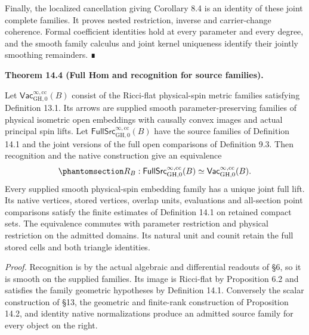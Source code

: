 \documentclass[
  english,
  11pt,
  reqno]{amsart}
\makeatletter
\newcommand{\pandocstatementheading}[1]{%
  \par\if@nobreak\else
    \addpenalty{\@beginparpenalty}%
    \addvspace{.5\baselineskip plus .2\baselineskip minus .2\baselineskip}%
  \fi
  {\normalfont\bfseries #1\par}%
  \nobreak\@afterindenttrue\@afterheading
}
\makeatother
\begin{document}
Finally, the localized cancellation giving Corollary 8.4 is an identity
of these joint complete families. It proves nested restriction, inverse
and carrier-change coherence. Formal coefficient identities hold at
every parameter and every degree, and the smooth family calculus and
joint kernel uniqueness identify their jointly smoothing remainders. ∎

\pandocstatementheading{\protect{}\label{thm:family-full-source-hom}Theorem 14.4 (Full Hom and recognition for source families).}

Let \(\mathsf{Vac}^{\infty,\mathrm{cc}}_{\mathrm{GH},0}(B)\) consist of
the Ricci-flat physical-spin metric families satisfying Definition 13.1.
Its arrows are supplied smooth parameter-preserving families of physical
isometric open embeddings with causally convex images and actual
principal spin lifts. Let
\(\mathsf{FullSrc}^{\infty,\mathrm{cc}}_{\mathrm{GH},0}(B)\) have the
source families of Definition 14.1 and the joint versions of the full
open comparisons of Definition 9.3. Then recognition and the native
construction give an equivalence
\begin{equation}\protect\phantomsection\label{eq:family-full-source-equivalence}{
R_B:\mathsf{FullSrc}^{\infty,\mathrm{cc}}_{\mathrm{GH},0}(B)
\simeq
\mathsf{Vac}^{\infty,\mathrm{cc}}_{\mathrm{GH},0}(B).
}\end{equation} Every supplied smooth physical-spin embedding family has
a unique joint full lift. Its native vertices, stored vertices, overlap
units, evaluations and all-section point comparisons satisfy the finite
estimates of Definition 14.1 on retained compact sets. The equivalence
commutes with parameter restriction and physical restriction on the
admitted domains. Its natural unit and counit retain the full stored
cells and both triangle identities.

\emph{Proof.} Recognition is by the actual algebraic and differential
readouts of §6, so it is smooth on the supplied families. Its image is
Ricci-flat by Proposition 6.2 and satisfies the family geometric
hypotheses by Definition 14.1. Conversely the scalar construction of
§13, the geometric and finite-rank construction of Proposition 14.2, and
identity native normalizations produce an admitted source family for
every object on the right.
\end{document}
